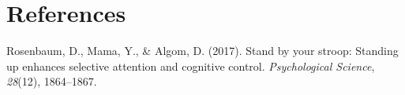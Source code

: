 \documentclass[man]{apa6}
\begin{document}
\newpage

\hypertarget{references}{%
\section{References}\label{references}}

\begingroup
\setlength{\parindent}{-0.5in}
\setlength{\leftskip}{0.5in}

\hypertarget{refs}{}
\leavevmode\hypertarget{ref-rosenbaum2017stand}{}%
Rosenbaum, D., Mama, Y., \& Algom, D. (2017). Stand by your stroop: Standing up enhances selective attention and cognitive control. \emph{Psychological Science}, \emph{28}(12), 1864--1867.

\endgroup
\end{document}
